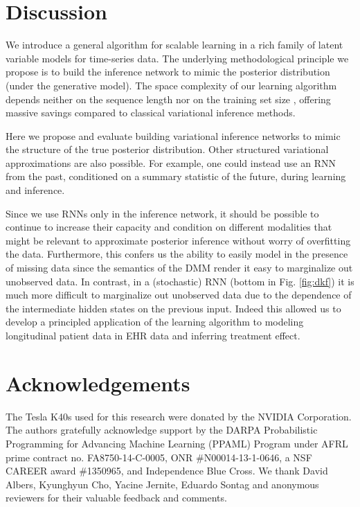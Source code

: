 \documentclass[letterpaper]{article}
\theoremstyle{plain}
\newcommand{\DMM}{DMM\xspace}
\begin{document}
{ \section{Discussion}

We introduce a general algorithm for scalable learning in a rich family of latent variable models for time-series data. The underlying methodological principle we propose is to build the inference network to mimic the posterior distribution (under the generative model).
The space complexity of our learning algorithm depends neither on the sequence
length  nor on the training set size , offering massive
savings compared to classical variational inference methods.

Here we propose and evaluate building variational inference networks to mimic
the structure of the true posterior distribution.  
Other structured variational approximations 
are also possible. For example, one could instead use an RNN 
from the past, conditioned on a summary statistic of the future,
during learning and inference.

Since we use RNNs only in the inference network, 
it should be possible to continue to increase their capacity and 
condition on different modalities that might be relevant to approximate 
posterior inference without worry of overfitting the data. 
Furthermore, this confers us the ability to easily model in the presence of missing data 
since the semantics of the \DMM render it easy to marginalize out unobserved data.
In contrast, in a (stochastic) RNN (bottom in Fig. \ref{fig:dkf}) it is much more difficult
to marginalize out unobserved data due to the dependence of the intermediate hidden states on the previous
input. Indeed this allowed us to develop a principled application of the learning algorithm to
modeling longitudinal patient data in EHR data and 
inferring treatment effect.  
 \section*{Acknowledgements}
The Tesla K40s used for this research were donated by the NVIDIA 
Corporation. The authors gratefully acknowledge support by the DARPA Probabilistic Programming for Advancing
Machine Learning (PPAML) Program under AFRL prime contract
no. FA8750-14-C-0005, ONR \#N00014-13-1-0646, a NSF CAREER award
\#1350965, and Independence Blue Cross. We thank David Albers, Kyunghyun Cho, Yacine Jernite, Eduardo Sontag and anonymous reviewers
for their valuable feedback and comments. 
 
}
\end{document}
